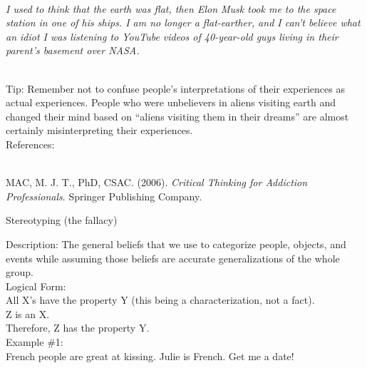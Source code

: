 \documentclass[a4paper,12pt,single,pdftex]{scrbook}
\begin{document}
    \\

    
      {\em I used to think that the earth was flat, then Elon Musk took me to the space station in one of his ships. I am no longer a flat-earther, and I can’t believe what an idiot I was listening to YouTube videos of 40-year-old guys living in their parent’s basement over NASA.} \newline

    \\

    
      Tip: Remember not to confuse people’s interpretations of their experiences as actual experiences. People who were unbelievers in aliens visiting earth and changed their mind based on “aliens visiting them in their dreams” are almost certainly misinterpreting their experiences.
    \\

    References:

    
      
        
      \\

      
        
          MAC, M. J. T., PhD, CSAC. (2006). {\it Critical Thinking for Addiction Professionals}. Springer Publishing Company.
        
      
    
  

Stereotyping (the fallacy)
    
      
        Description: The general beliefs that we use to categorize people, objects, and events while assuming those beliefs are accurate generalizations of the whole group.
      \\

      
        Logical Form:
      \\

      
        All X’s have the property Y (this being a characterization, not a fact).
      \\

      
        Z  is an X.
      \\

      
        Therefore, Z has the property Y.
      \\

      
        Example \#1:
      \\

      
        French people are great at kissing.  Julie is French.  Get me a date!
      \\
\end{document}

